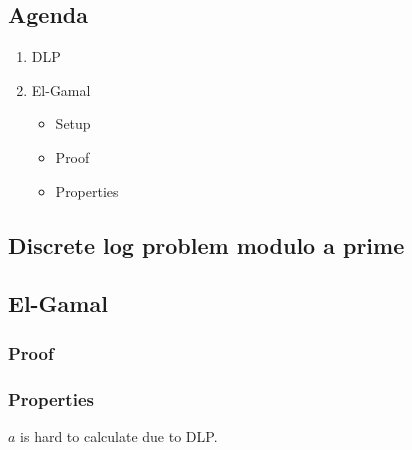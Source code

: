 

\subsection*{Agenda}
\begin{enumerate}
\item DLP
\item El-Gamal
  \begin{itemize}
  \item Setup
  \item Proof
  \item Properties
  \end{itemize}
\end{enumerate}


\subsection{Discrete log problem modulo a prime}


\subsection{El-Gamal}

\subsubsection*{Proof}


\subsubsection*{Properties}
$a$ is hard to calculate due to DLP.
